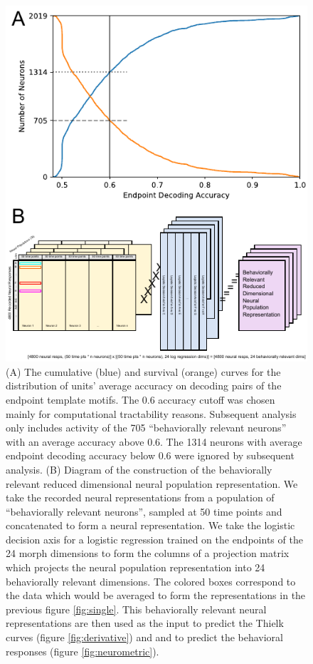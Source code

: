 \begin{figure}[tbp] 
  \centering
  \includegraphics[width=114mm]{figures/fig06_neural_rep.pdf}
  \caption[Behaviorally relevant neural representation]
{
(A) The cumulative (blue) and survival (orange) curves for the distribution of units’ average accuracy on decoding pairs of the endpoint template motifs. The 0.6 accuracy cutoff was chosen mainly for computational tractability reasons. Subsequent analysis only includes activity of the 705 “behaviorally relevant neurons” with an average accuracy above 0.6. The 1314 neurons with average endpoint decoding accuracy below 0.6 were ignored by subsequent analysis.
(B) Diagram of the construction of the behaviorally relevant reduced dimensional neural population representation. We take the recorded neural representations from a population of “behaviorally relevant neurons”, sampled at 50 time points and concatenated to form a neural representation. We take the logistic decision axis for a logistic regression trained on the endpoints of the 24 morph dimensions to form the columns of a projection matrix which projects the neural population representation into 24 behaviorally relevant dimensions. The colored boxes correspond to the data which would be averaged to form the representations in the previous figure \ref{fig:single}. This behaviorally relevant neural representations are then used as the input to predict the Thielk curves (figure \ref{fig:derivative}) and and to predict the behavioral responses (figure \ref{fig:neurometric}). 
}
  \label{fig:neural_rep}
\end{figure}